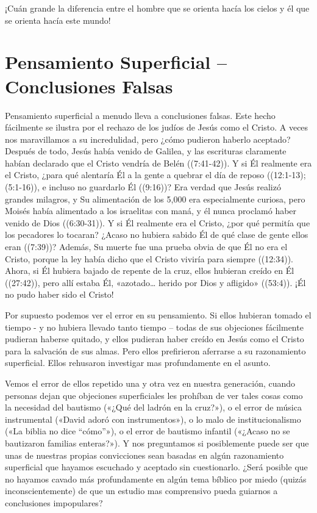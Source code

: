 \documentclass[12pt, twoside, openright]{book}
\begin{document}
¡Cuán grande la diferencia entre el hombre que se orienta hacía los cielos y él que se orienta hacía este mundo!

\section{Pensamiento Superficial – Conclusiones Falsas}
Pensamiento superficial a menudo lleva a conclusiones falsas. Este hecho fácilmente se ilustra por el rechazo de los judíos de Jesús como el Cristo. A veces nos maravillamos a su incredulidad, pero ¿cómo pudieron haberlo aceptado? Después de todo, Jesús había venido de Galilea, y las escrituras claramente habían declarado que el Cristo vendría de Belén ((7:41-42)). Y si Él realmente era el Cristo, ¿para qué alentaría Él a la gente a quebrar el día de reposo ((12:1-13); (5:1-16)), e incluso no guardarlo Él ((9:16))? Era verdad que Jesús realizó grandes milagros, y Su alimentación de los 5,000 era especialmente curiosa, pero Moisés había alimentado a los israelitas con maná, y él nunca proclamó haber venido de Dios ((6:30-31)). Y si Él realmente era el Cristo, ¿por qué permitía que los pecadores lo tocaran? ¿Acaso no hubiera sabido Él de qué clase de gente ellos eran ((7:39))? Además, Su muerte fue una prueba obvia de que Él no era el Cristo, porque la ley había dicho que el Cristo viviría para siempre ((12:34)). Ahora, si Él hubiera bajado de repente de la cruz, ellos hubieran creído en Él ((27:42)), pero allí estaba Él, «azotado… herido por Dios y afligido» ((53:4)). ¡Él no pudo haber sido el Cristo!

Por supuesto podemos ver el error en su pensamiento. Si ellos hubieran tomado el tiempo - y no hubiera llevado tanto tiempo – todas de sus objeciones fácilmente pudieran haberse quitado, y ellos pudieran haber creído en Jesús como el Cristo para la salvación de sus almas. Pero ellos prefirieron aferrarse a su razonamiento superficial. Ellos rehusaron investigar mas profundamente en el asunto.

Vemos el error de ellos repetido una y otra vez en nuestra generación, cuando personas dejan que objeciones superficiales les prohíban de ver tales cosas como la necesidad del bautismo («¿Qué del ladrón en la cruz?»), o el error de música instrumental («David adoró con instrumentos»), o lo malo de institucionalismo («La biblia no dice “cómo”»), o el error de bautismo infantil («¿Acaso no se bautizaron familias enteras?»). Y nos preguntamos si posiblemente puede ser que unas de nuestras propias convicciones sean basadas en algún razonamiento superficial que hayamos escuchado y aceptado sin cuestionarlo. ¿Será posible que no hayamos cavado más profundamente en algún tema bíblico por miedo (quizás inconscientemente) de que un estudio mas comprensivo pueda guiarnos a conclusiones impopulares?
\end{document}
